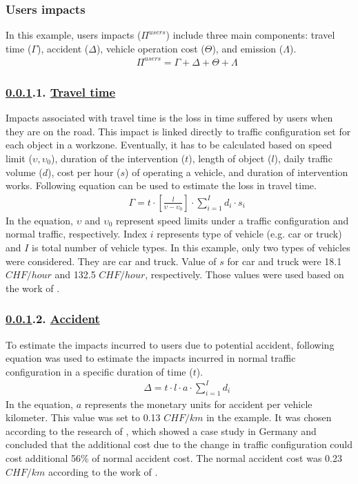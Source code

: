 \documentclass[a4paper,3p,times,authoryear]{elsarticle}
\begin{document}
\subsubsection{Users impacts} \label{userimpacts}
In this example, users impacts ($\Pi^{users}$) include three main components: travel time ($\Gamma$), accident ($\Delta$), vehicle operation cost ($\Theta$), and emission ($\Lambda$).
\begin{eqnarray}
      && \Pi^{users}=\Gamma+\Delta+\Theta + \Lambda \label{usersimpacts}
\end{eqnarray}
%
\subsubsection*{\ref{userimpacts}.1. \underline{Travel time}}

Impacts associated with travel time is the loss in time suffered by users when they are on the road. This impact is linked directly to traffic configuration set for each object in a workzone. Eventually, it has to be calculated based on speed limit ($\upsilon, \upsilon_0$), duration of the intervention ($t$), length of object ($l$), daily traffic volume ($d$), cost per hour ($s$) of operating a vehicle, and duration of intervention works. Following equation can be used to estimate the loss in travel time.
\begin{eqnarray}
      && \Gamma= t \cdot \left[ \frac{l}{\upsilon-\upsilon_0} \right]\cdot\sum_{i=1}^{I} d_i\cdot s_i \label{traveltimeimpacts}
\end{eqnarray}
In the equation, $\upsilon$ and $\upsilon_0$ represent speed limits under a traffic configuration and normal traffic, respectively. Index $i$ represents type of vehicle (e.g. car or truck) and $I$ is total number of vehicle types. In this example, only two types of vehicles were considered. They are car and truck. Value of $s$ for car and truck were 18.1 $CHF/hour$ and 132.5 $CHF/hour$, respectively. Those values were used based on the work of \cite{De-Jong2008}.
\subsubsection*{\ref{userimpacts}.2. \underline{Accident}}
To estimate the impacts incurred to users due to potential accident, following equation was used to estimate the impacts incurred in normal traffic configuration in a specific duration of time ($t$).
\begin{eqnarray}
      && \Delta= t \cdot l \cdot a \cdot \sum_{i=1}^{I} d_i \label{accidentimpact}
\end{eqnarray}
In the equation, $a$ represents the monetary units for accident per vehicle kilometer. This value was set to 0.13 $CHF/km$ in the example. It was chosen according to the research of \cite{Bakaba2012}, which showed a case study in Germany and concluded that the additional cost due to the change in traffic configuration could cost additional 56\% of normal accident cost. The normal accident cost was 0.23 $CHF/km$ according to the work of \cite{Lethanh2014b}.
%
\end{document}
